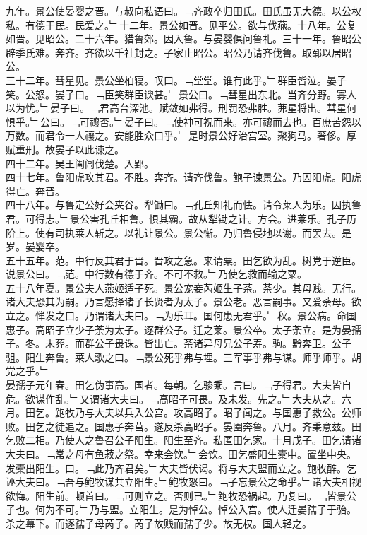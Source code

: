 \documentclass{zhvt-classic}
\begin{document}
\hspace*{2em}九年。景公使晏婴之晋。与叔向私语曰。﹁齐政卒归田氏。田氏虽无大德。以公权私。有德于民。民爱之。﹂十二年。景公如晋。见平公。欲与伐燕。十八年。公复如晋。见昭公。二十六年。猎鲁郊。因入鲁。与晏婴俱问鲁礼。三十一年。鲁昭公辟季氏难。奔齐。齐欲以千社封之。子家止昭公。昭公乃请齐伐鲁。取郓以居昭公。\\
\hspace*{2em}三十二年。彗星见。景公坐柏寝。叹曰。﹁堂堂。谁有此乎。﹂群臣皆泣。晏子笑。公怒。晏子曰。﹁臣笑群臣谀甚。﹂景公曰。﹁彗星出东北。当齐分野。寡人以为忧。﹂晏子曰。﹁君高台深池。赋敛如弗得。刑罚恐弗胜。茀星将出。彗星何惧乎。﹂公曰。﹁可禳否。﹂晏子曰。﹁使神可祝而来。亦可禳而去也。百庶苦怨以万数。而君令一人禳之。安能胜众口乎。﹂是时景公好治宫室。聚狗马。奢侈。厚赋重刑。故晏子以此谏之。\\
\hspace*{2em}四十二年。吴王阖闾伐楚。入郢。\\
\hspace*{2em}四十七年。鲁阳虎攻其君。不胜。奔齐。请齐伐鲁。鲍子谏景公。乃囚阳虎。阳虎得亡。奔晋。\\
\hspace*{2em}四十八年。与鲁定公好会夹谷。犁锄曰。﹁孔丘知礼而怯。请令莱人为乐。因执鲁君。可得志。﹂景公害孔丘相鲁。惧其霸。故从犁锄之计。方会。进莱乐。孔子历阶上。使有司执莱人斩之。以礼让景公。景公惭。乃归鲁侵地以谢。而罢去。是岁。晏婴卒。\\
\hspace*{2em}五十五年。范。中行反其君于晋。晋攻之急。来请粟。田乞欲为乱。树党于逆臣。说景公曰。﹁范。中行数有德于齐。不可不救。﹂乃使乞救而输之粟。\\
\hspace*{2em}五十八年夏。景公夫人燕姬适子死。景公宠妾芮姬生子荼。荼少。其母贱。无行。诸大夫恐其为嗣。乃言愿择诸子长贤者为太子。景公老。恶言嗣事。又爱荼母。欲立之。惮发之口。乃谓诸大夫曰。﹁为乐耳。国何患无君乎。﹂秋。景公病。命国惠子。高昭子立少子荼为太子。逐群公子。迁之莱。景公卒。太子荼立。是为晏孺子。冬。未葬。而群公子畏诛。皆出亡。荼诸异母兄公子寿。驹。黔奔卫。公子驵。阳生奔鲁。莱人歌之曰。﹁景公死乎弗与埋。三军事乎弗与谋。师乎师乎。胡党之乎。﹂\\
\hspace*{2em}晏孺子元年春。田乞伪事高。国者。每朝。乞骖乘。言曰。﹁子得君。大夫皆自危。欲谋作乱。﹂又谓诸大夫曰。﹁高昭子可畏。及未发。先之。﹂大夫从之。六月。田乞。鲍牧乃与大夫以兵入公宫。攻高昭子。昭子闻之。与国惠子救公。公师败。田乞之徒追之。国惠子奔莒。遂反杀高昭子。晏圉奔鲁。八月。齐秉意兹。田乞败二相。乃使人之鲁召公子阳生。阳生至齐。私匿田乞家。十月戊子。田乞请诸大夫曰。﹁常之母有鱼菽之祭。幸来会饮。﹂会饮。田乞盛阳生橐中。置坐中央。发橐出阳生。曰。﹁此乃齐君矣。﹂大夫皆伏谒。将与大夫盟而立之。鲍牧醉。乞诬大夫曰。﹁吾与鲍牧谋共立阳生。﹂鲍牧怒曰。﹁子忘景公之命乎。﹂诸大夫相视欲悔。阳生前。顿首曰。﹁可则立之。否则已。﹂鲍牧恐祸起。乃复曰。﹁皆景公子也。何为不可。﹂乃与盟。立阳生。是为悼公。悼公入宫。使人迁晏孺子于骀。杀之幕下。而逐孺子母芮子。芮子故贱而孺子少。故无权。国人轻之。\\
\end{document}
